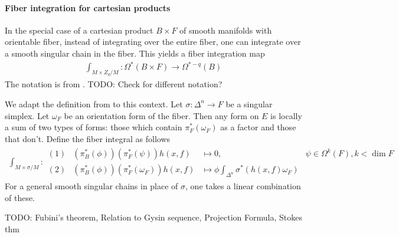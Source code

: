 \documentclass{scrartcl}
\theoremstyle{plain}
\theoremstyle{definition}
\begin{document}
    \paragraph{Fiber integration for cartesian products} In the special case of a cartesian product $B\times F$ of smooth manifolds with orientable fiber, instead of integrating over the entire fiber, one can integrate over a smooth singular chain in the fiber. This yields a fiber integration map 
    \begin{align*}
        \int_{M\times Z_q / M} \colon \Omega^*(B\times F) \to \Omega^{*-q}(B)
    \end{align*}
    The notation is from \cite{hopkins2005quadratic}. TODO: Check for different notation?
    
    We adapt the definition from \cite{bott1982differential} to this context. Let $\sigma\colon \Delta^n\to F$ be a singular simplex. Let $\omega_F$ be an orientation form of the fiber. Then any form on $E$ is locally a sum of two types of forms: those which contain $\pi_F^*(\omega_F)$ as a factor and those that don't. Define the fiber integral as follows
    \begin{align*}
        \int_{M\times\sigma / M} \colon \begin{array}{llll}
             (1) & (\pi_B^*(\phi)) (\pi_F^*(\psi)) h(x, f)  &\mapsto 0, & \psi\in \Omega^k(F), k<\dim F \\
             (2) & (\pi_B^*(\phi)) (\pi_F^*(\omega_F)) h(x, f)  &\mapsto \phi \int_{\Delta^n} \sigma^*(h(x, f) \omega_F) &
        \end{array}
    \end{align*}
    For a general smooth singular chains in place of $\sigma$, one takes a linear combination of these. 

    TODO: Fubini's theorem, Relation to Gysin sequence, Projection Formula, Stokes thm
\end{document}
